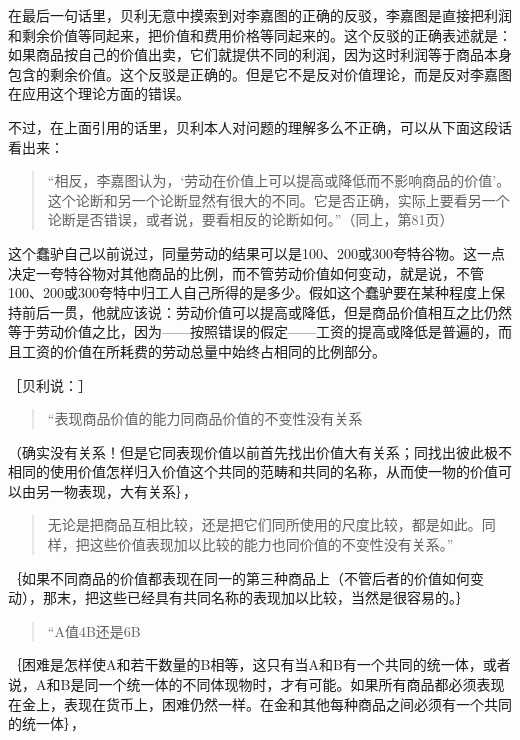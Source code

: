 在最后一句话里，贝利无意中摸索到对李嘉图的正确的反驳，李嘉图是直接把利润和剩余价值等同起来，把价值和费用价格等同起来的。这个反驳的正确表述就是：如果商品按自己的价值出卖，它们就提供不同的利润，因为这时利润等于商品本身包含的剩余价值。这个反驳是正确的。但是它不是反对价值理论，而是反对李嘉图在应用这个理论方面的错误。

不过，在上面引用的话里，贝利本人对问题的理解多么不正确，可以从下面这段话看出来：

\begin{quote}{“相反，李嘉图认为，‘劳动在价值上可以提高或降低而不影响商品的价值’。这个论断和另一个论断显然有很大的不同。它是否正确，实际上要看另一个论断是否错误，或者说，要看相反的论断如何。”（同上，第81页）}\end{quote}

这个蠢驴自己以前说过，同量劳动的结果可以是100、200或300夸特谷物。这一点决定一夸特谷物对其他商品的比例，而不管劳动价值如何变动，就是说，不管100、200或300夸特中归工人自己所得的是多少。假如这个蠢驴要在某种程度上保持前后一贯，他就应该说：劳动价值可以提高或降低，但是商品价值相互之比仍然等于劳动价值之比，因为——按照错误的假定——工资的提高或降低是普遍的，而且工资的价值在所耗费的劳动总量中始终占相同的比例部分。


［贝利说：］

\begin{quote}{“表现商品价值的能力同商品价值的不变性没有关系}\end{quote}

（确实没有关系！但是它同表现价值以前首先找出价值大有关系；同找出彼此极不相同的使用价值怎样归入价值这个共同的范畴和共同的名称，从而使一物的价值可以由另一物表现，大有关系｝，

\begin{quote}{无论是把商品互相比较，还是把它们同所使用的尺度比较，都是如此。同样，把这些价值表现加以比较的能力也同价值的不变性没有关系。”}\end{quote}

｛如果不同商品的价值都表现在同一的第三种商品上（不管后者的价值如何变动），那末，把这些已经具有共同名称的表现加以比较，当然是很容易的。｝

\begin{quote}{“A值4B还是6B}\end{quote}

｛困难是怎样使A和若干数量的B相等，这只有当A和B有一个共同的统一体，或者说，A和B是同一个统一体的不同体现物时，才有可能。如果所有商品都必须表现在金上，表现在货币上，困难仍然一样。在金和其他每种商品之间必须有一个共同的统一体｝，

